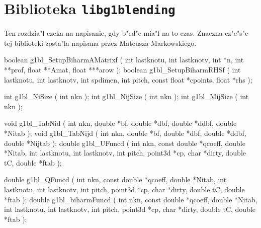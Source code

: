 

\chapter{Biblioteka \texttt{libg1blending}}

Ten rozdzia"l czeka na napisanie, gdy b"ed"e mia"l na to czas. Znaczna
cz"e"s"c tej biblioteki zosta"la napisana przez Mateusza Markowskiego.

\begin{listingC}
boolean g1bl_SetupBiharmAMatrixf ( int lastknotu, int lastknotv,
                       int *n, int **prof, float **Amat, float ***arow );
boolean g1bl_SetupBiharmRHSf ( int lastknotu, int lastknotv,
                            int spdimen, int pitch, const float *cpoints,
                            float *rhs );
\end{listingC}

\begin{listingC}
int g1bl_NiSize ( int nkn );
int g1bl_NijSize ( int nkn );
int g1bl_MijSize ( int nkn );
\end{listingC}

\begin{listingC}
void g1bl_TabNid ( int nkn, double *bf, double *dbf, double *ddbf,
                   double *Nitab );
void g1bl_TabNijd ( int nkn, double *bf, double *dbf, double *ddbf,
                    double *Nijtab );
double g1bl_UFuncd ( int nkn, const double *qcoeff, double *Nitab,
                     int lastknotu, int lastknotv, int pitch, point3d *cp,
                     char *dirty,
                     double tC, double *ftab );
\end{listingC}

\begin{listingC}
double g1bl_QFuncd ( int nkn, const double *qcoeff, double *Nitab,
                     int lastknotu, int lastknotv, int pitch, point3d *cp,
                     char *dirty,
                     double tC, double *ftab );
double g1bl_biharmFuncd ( int nkn, const double *qcoeff, double *Nitab,   
                     int lastknotu, int lastknotv, int pitch, point3d *cp,
                     char *dirty,
                     double tC, double *ftab );
\end{listingC}


